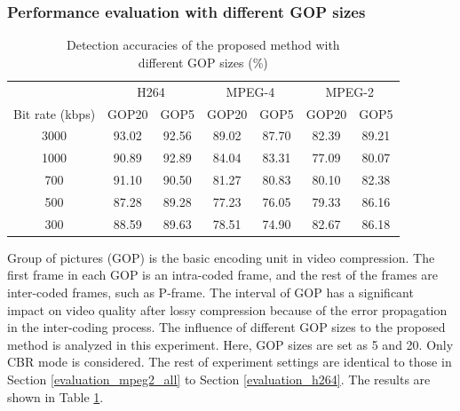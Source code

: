 \documentclass[journal,sort]{IEEEtran}
\begin{document}
\subsubsection{Performance evaluation with different GOP sizes \label{evaluation_gop}}

\begin{table}[!htbp]
	\centering
	\caption{Detection accuracies of the proposed method with\\ different GOP sizes (\%)}
	\begin{tabular}{ccccccc}
		\toprule
		& \multicolumn{2}{c}{H264} & \multicolumn{2}{c}{MPEG-4} & \multicolumn{2}{c}{MPEG-2} \\
		\cmidrule(r){2-3}\cmidrule(r){4-5}\cmidrule(r){6-7}
		Bit rate (kbps)& GOP20 & GOP5  & GOP20 & GOP5  & GOP20 & GOP5 \\
		\midrule
		3000  & 93.02 & 92.56 & 89.02 & 87.70 & 82.39 & 89.21 \\
		1000  & 90.89 & 92.89 & 84.04 & 83.31 & 77.09 & 80.07 \\
		700   & 91.10 & 90.50 & 81.27 & 80.83 & 80.10 & 82.38 \\
		500   & 87.28 & 89.28 & 77.23 & 76.05 & 79.33 & 86.16 \\
		300   & 88.59 & 89.63 & 78.51 & 74.90 & 82.67 & 86.18 \\
		\bottomrule
	\end{tabular}%
	\label{tab:GOP}%
\end{table}%

Group of pictures (GOP) is the basic encoding unit in video compression. The first frame in each GOP is an intra-coded frame, and the rest of the frames are inter-coded frames, such as P-frame. The interval of GOP has a significant impact on video quality after lossy compression because of the error propagation in the inter-coding process. The influence of different GOP sizes to the proposed method is analyzed in this experiment. Here, GOP sizes are set as 5 and 20. Only CBR mode is considered. The rest of experiment settings are identical to those in Section \ref{evaluation_mpeg2_all} to Section \ref{evaluation_h264}. The results are shown in Table \ref{tab:GOP}.
\end{document}
